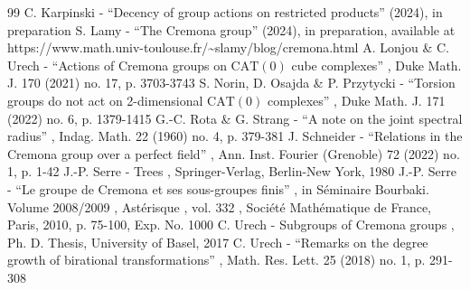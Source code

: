 \documentclass[11pt]{article}
\numberwithin{equation}{section}
\theoremstyle{plain}
\theoremstyle{definition}
\begin{document}
\begin{thebibliography}{99}
 C. Karpinski - “Decency of group actions on restricted products” (2024), in preparation
 S. Lamy - “The Cremona group” (2024), in preparation, available at https://www.math.univ-toulouse.fr/\textasciitilde{}slamy/blog/cremona.html
 A. Lonjou \& C. Urech - “Actions of Cremona groups on $\mathrm{CAT}(0)$ cube complexes” , Duke Math. J. 170 (2021) no. 17, p. 3703-3743
 S. Norin, D. Osajda \& P. Przytycki - “Torsion groups do not act on 2-dimensional $\mathrm{CAT}(0)$ complexes” , Duke Math. J. 171 (2022) no. 6, p. 1379-1415
 G.-C. Rota \& G. Strang - “A note on the joint spectral radius” , Indag. Math. 22 (1960) no. 4, p. 379-381
 J. Schneider - “Relations in the Cremona group over a perfect field” , Ann. Inst. Fourier (Grenoble) 72 (2022) no. 1, p. 1-42
 J.-P. Serre - Trees , Springer-Verlag, Berlin-New York, 1980
 J.-P. Serre - “Le groupe de Cremona et ses sous-groupes finis” , in Séminaire Bourbaki. Volume 2008/2009 , Astérisque , vol. 332 , Société Mathématique de France, Paris, 2010, p. 75-100, Exp. No. 1000
 C. Urech - Subgroups of Cremona groups , Ph. D. Thesis, University of Basel, 2017
 C. Urech - “Remarks on the degree growth of birational transformations” , Math. Res. Lett. 25 (2018) no. 1, p. 291-308
\end{thebibliography}
\end{document}
